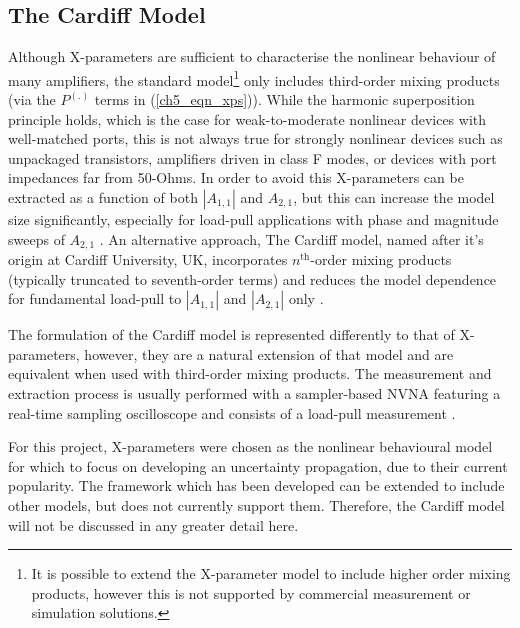 \documentclass[../thesis/thesis.tex]{subfiles}
\begin{document}
\begin{refsection}
\subsection{The Cardiff Model}

Although X-parameters are sufficient to characterise the nonlinear behaviour of many amplifiers, the standard model\footnote{It is possible to extend the X-parameter model to include higher order mixing products, however this is not supported by commercial measurement or simulation solutions.} only includes third-order mixing products (via the $P^{(.)}$ terms in (\ref{ch5_eqn_xps})). While the harmonic superposition principle holds, which is the case for weak-to-moderate nonlinear devices with well-matched ports, this is not always true for strongly nonlinear devices such as unpackaged transistors, amplifiers driven in class F modes, or devices with port impedances far from 50-Ohms. In order to avoid this X-parameters can be extracted as a function of both $|A_{1,1}|$ and $A_{2,1}$, but this can increase the model size significantly, especially for load-pull applications with phase and magnitude sweeps of $A_{2,1}$ \cite{Gunyan_2009}. An alternative approach,  The Cardiff model, named after it's origin at Cardiff University, UK, incorporates $n^{\textrm{th}}$-order mixing products (typically truncated to seventh-order terms) and reduces the model dependence for fundamental load-pull to $|A_{1,1}|$ and $|A_{2,1}|$ only \cite{Woodington_2008,Qi_2009}.

The formulation of the Cardiff model is represented differently to that of X-parameters, however, they are a natural extension of that model and are equivalent when used with third-order mixing products. The measurement and extraction process is usually performed with a sampler-based NVNA featuring a real-time sampling oscilloscope and consists of a load-pull measurement \cite{Woodington_2010}.

For this project, X-parameters were chosen as the nonlinear behavioural model for which to focus on developing an uncertainty propagation, due to their current popularity. The framework which has been developed can be extended to include other models, but does not currently support them. Therefore, the Cardiff model will not be discussed in any greater detail here.


\end{refsection}
\end{document}
